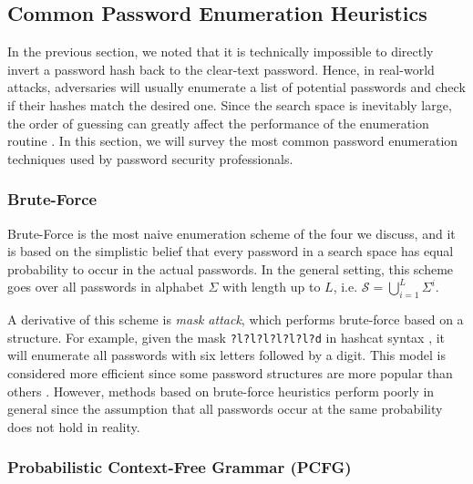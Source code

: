 \documentclass{article} %
\theoremstyle{definition}
\theoremstyle{theorem}
\theoremstyle{remark}
\theoremstyle{remark}
\begin{document}
\subsection{Common Password Enumeration Heuristics}
\par\quad In the previous section, we noted that it is technically impossible to directly invert a password hash back to the clear-text password. Hence, in real-world attacks, adversaries will usually enumerate a list of potential passwords and check if their hashes match the desired one. Since the search space is inevitably large, the order of guessing can greatly affect the performance of the enumeration routine \cite{empirical}. In this section, we will survey the most common password enumeration techniques used by password security professionals.

\subsubsection{Brute-Force}
\par\quad Brute-Force is the most naive enumeration scheme of the four we discuss, and it is based on the simplistic belief that every password in a search space has equal probability to occur in the actual passwords. In the general setting, this scheme goes over all passwords in alphabet $\Sigma$ with length up to $L$, i.e. $\mathcal{S} = \bigcup_{i=1}^{L}{\Sigma^i}$.

\par\quad A derivative of this scheme is \emph{mask attack}, which performs brute-force based on a structure. For example, given the mask \texttt{?l?l?l?l?l?l?d} in hashcat syntax \cite{hashcat-mask}, it will enumerate all passwords with six letters followed by a digit. This model is considered more efficient since some password structures are more popular than others \cite{addbang}. However, methods based on brute-force heuristics perform poorly in general since the assumption that all passwords occur at the same probability does not hold in reality.

\subsubsection{Probabilistic Context-Free Grammar (PCFG)}
\end{document}
